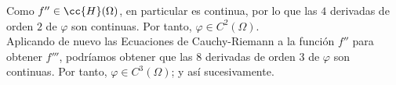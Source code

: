 \documentclass[12pt]{article}
\begin{document}
\begin{ejercicio}
\begin{enumerate}
            Como $f''\in \cc{H}(\Omega)$, en particular es continua, por lo que las $4$ derivadas de orden $2$ de $\varphi$ son continuas. Por tanto, $\varphi\in C^2(\Omega)$.\\

            Aplicando de nuevo las Ecuaciones de Cauchy-Riemann a la función $f''$ para obtener $f'''$, podríamos obtener que las $8$ derivadas de orden $3$ de $\varphi$ son continuas. Por tanto, $\varphi\in C^3(\Omega)$; y así sucesivamente.
        \end{enumerate}
    \end{ejercicio}
\end{document}
